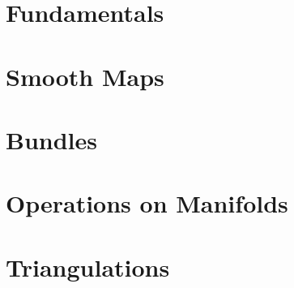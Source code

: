 

\section{Fundamentals}


\section{Smooth Maps}


\section{Bundles}


\section{Operations on Manifolds}


\section{Triangulations}



%
